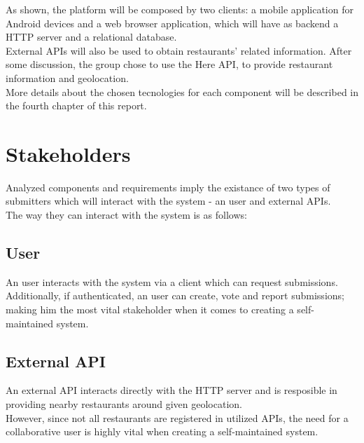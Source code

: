 As shown, the platform will be composed by two clients: a mobile application for Android devices and a web browser
application, which will have as backend a HTTP server and a relational database.\\

External APIs will also be used to obtain restaurants' related information. After some discussion, the group chose
to use the Here API, to provide restaurant information and geolocation.\\

More details about the chosen tecnologies for each component will be described in the fourth chapter of this report.\\

\section{Stakeholders}

Analyzed components and requirements imply the existance of two types of submitters which will interact with the system - an user and external APIs.\\

The way they can interact with the system is as follows:\\

\subsection{User}

An user interacts with the system via a client which can request submissions.
Additionally, if authenticated, an user can create, vote and report submissions; making him the most vital stakeholder when it comes to creating a self-maintained system.

\subsection{External API}

An external API interacts directly with the HTTP server and is resposible in providing nearby restaurants around given geolocation.\\

However, since not all restaurants are registered in utilized APIs, the need for a collaborative user is highly vital when creating a self-maintained system.\\